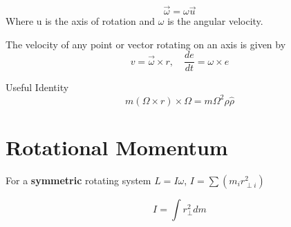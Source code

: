 \begin{equation}
	\label{}
	\vec{\omega}=\omega\vec{u}
\end{equation}
Where u is the axis of rotation and $\omega$ is the angular velocity. 


\hfill

The velocity of any point or vector rotating on an axis is given by
\begin{equation}
	\label{}
	v=\vec{\omega} \times r,\quad \frac{de}{dt}=\omega \times e
\end{equation}



Useful Identity
\begin{equation}
	\label{}
	m(\Omega \times r) \times  \Omega = m\Omega^{2}\rho\hat{\rho}
\end{equation}

\section{Rotational Momentum}
For a \textbf{symmetric} rotating system $L=I\omega$, $I=\sum(m_{i}r_{\perp i}^{2})$

\begin{equation}
	\label{}
	I=\int r_{\perp}^{2} dm
\end{equation}





